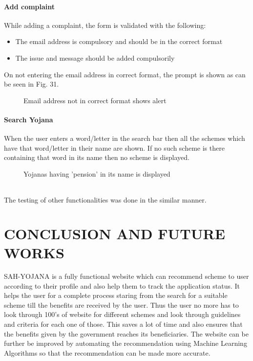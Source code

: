 \documentclass[conference]{IEEEtran}
\begin{document}
\paragraph{Add complaint}
While adding a complaint, the form is validated with the following:
\begin{itemize}
    \item The email address is compulsory and should be in the correct format
    \item The issue and message should be added compulsorily
\end{itemize}
On not entering the email address in correct format, the prompt is shown as can be seen in Fig. 31.
\begin{figure}[h!]
\centering
{}
\caption{Email address not in correct format shows alert}
\end{figure}

\paragraph{Search Yojana}
When the user enters a word/letter in the search bar then all the schemes which have that word/letter in their name are shown. If no such scheme is there containing that word in its name then no scheme is displayed.
\begin{figure}[h!]
\centering
{}
\caption{Yojanas having 'pension' in its name is displayed}
\end{figure}
\\The testing of other functionalities was done in the similar manner.
\section{CONCLUSION AND FUTURE WORKS}
SAH-YOJANA is a fully functional website which can recommend scheme to user according to their profile and also help them to track the application status. It helps the user for a complete process staring from the search for a suitable scheme till the benefits are received by the user. Thus the user no more has to look through 100's of website for different schemes and look through guidelines and criteria for each one of those. This saves a lot of time and also ensures that the benefits given by the government reaches its beneficiaries.
The website can be further be improved by automating the recommendation using Machine Learning Algorithms so that the recommendation can be made more accurate. 
\end{document}
